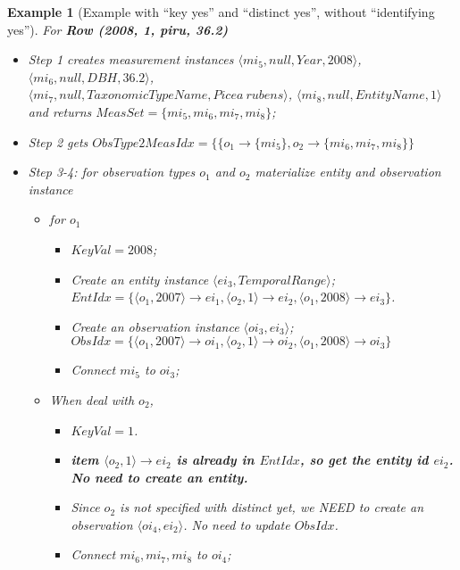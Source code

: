 \documentclass[10pt]{article}
\newtheorem{example}{Example}[section]
\begin{document}
\begin{example} [Example with ``key yes'' and ``distinct yes'', without ``identifying yes'']
    
For {\bf Row (2008, 1, piru, 36.2)}
    \begin{itemize}
    \item Step 1 creates measurement instances $\langle mi_5, null, Year, 2008\rangle$,
    $\langle mi_6, null, DBH, 36.2\rangle$,\\
    $\langle mi_7, null, TaxonomicTypeName, Picea~rubens\rangle$,
    $\langle mi_8, null, EntityName, 1\rangle$\\
    and returns $MeasSet = \{mi_5, mi_6, mi_7, mi_8\}$;
    \item Step 2 gets $ObsType2MeasIdx = \{\{o_1\rightarrow \{mi_5\}, o_2 \rightarrow \{mi_6, mi_7, mi_8\}\}$
    \item Step 3-4: for observation types $o_1$ and $o_2$ materialize entity and observation instance
        \begin{itemize}
            \item for $o_1$
            \begin{itemize}
            \item  $KeyVal=2008$;
            \item Create an entity instance $\langle ei_3, TemporalRange\rangle$; \\
                $EntIdx=\{\langle o_1, 2007 \rangle \rightarrow ei_1, \langle o_2, 1 \rangle \rightarrow ei_2, \langle o_1, 2008 \rangle \rightarrow ei_3\}$.
             \item Create an observation instance $\langle oi_3, ei_3 \rangle$;\\
              $ObsIdx=\{\langle o_1, 2007\rangle\rightarrow oi_1, \langle o_2, 1\rangle\rightarrow oi_2, \langle o_1, 2008\rangle\rightarrow oi_3\}$
		\item Connect $mi_5$ to $oi_3$; 
            \end{itemize}
            \item When deal with $o_2$,
            \begin{itemize}
             \item $KeyVal=1$.
            \item {\bf item $\langle o_2, 1 \rangle \rightarrow ei_2$ is already in $EntIdx$, so get the entity id $ei_2$. No need to create an entity.}
            \item Since $o_2$ is not specified with {\em distinct yet}, we NEED to create an observation $\langle oi_4, ei_2 \rangle$. No need to update $ObsIdx$.
		\item Connect $mi_6, mi_7, mi_8$ to $oi_4$; 
            \end{itemize}

\end{itemize}
\end{itemize}
\end{example}
\end{document}
